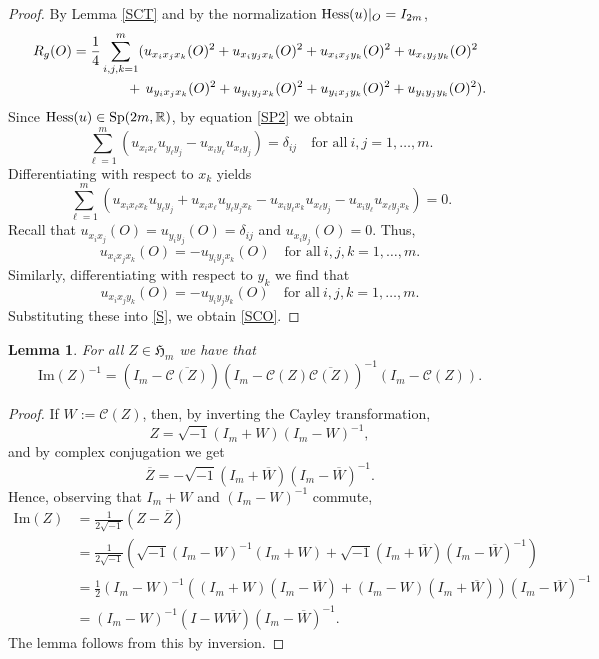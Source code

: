 \documentclass[11pt,reqno]{amsart}
\newcommand{\R}{\mathbb{R}}
\theoremstyle{plain}
\newtheorem{lemma}[theorem]{Lemma}
\theoremstyle{definition}
\numberwithin{equation}{section}
\begin{document}
\begin{proof}
By Lemma \ref{SCT} and by the normalization ${\rm Hess}(u)|_O = I_{2m}$,
\begin{align}\label{S}
\begin{split}
    R_g(O)&= \frac{1}{4}\sum_{i,j,k=1}^{m} (u_{x_{i}x_{j}x_{k}}(O)^{2} + u_{x_{i}y_{j}x_{k}}(O)^{2} +u_{x_{i}x_{j}y_{k}}(O)^{2} +u_{x_{i}y_{j}y_{k}}(O)^{2} \\
    &   \displaystyle \ \ \ \ \ \ \hspace{5.5mm}\ +\,u_{y_{i}x_{j}x_{k}}(O)^{2} +u_{y_{i}y_{j}x_{k}}(O)^{2}+u_{y_{i}x_{j}y_{k}}(O)^{2}+u_{y_{i}y_{j}y_{k}}(O)^{2}).
\end{split}
\end{align}
Since ${\rm Hess}(u)\in {\rm Sp}(2m,\R)$, by equation \eqref{SP2} we obtain
$$\sum_{\ell=1}^m (u_{x_i x_\ell} u_{y_\ell y_j} - u_{x_i y_\ell} u_{x_\ell y_j})= \delta_{ij} \quad \text{for all} \  i,j = 1, \ldots, m.$$
Differentiating with respect to $x_{k}$ yields
$$\sum_{\ell=1}^m (u_{x_i x_\ell x_k} u_{y_\ell y_j} + u_{x_i x_\ell} u_{y_\ell y_j x_k} - u_{x_i y_\ell x_k} u_{x_\ell y_j} - u_{x_i y_\ell} u_{x_\ell y_j x_k}) = 0.$$
Recall that $u_{x_{i}x_{j}}(O)=u_{y_{i}y_{j}}(O)=\delta_{ij}$ and $u_{x_{i}y_{j}}(O)=0$. Thus,
$$u_{x_{i}x_{j}x_{k}}(O) =-u_{y_{i}y_{j}x_{k}}(O) \quad \text{for all}\  i,j,k=1,\ldots,m.$$
Similarly, differentiating with respect to $y_{k}$ we find that
$$u_{x_i x_j y_k}(O) = - u_{y_i y_j y_k}(O) \quad \text{for all}\ i,j,k=1,\ldots,m.$$
Substituting these into \eqref{S}, we obtain \eqref{SCO}. 
\end{proof}

\begin{lemma}\label{CT}
For all $Z \in \mathfrak{H}_m$ we have that
$$\mathrm{Im}(Z)^{-1}=(I_{m}-\overline{{\mathscr{C}(Z)}})(I_{m}-\mathscr{C}(Z)\overline{\mathscr{C}(Z)})^{-1}(I_{m}-\mathscr{C}(Z)).$$
\end{lemma}

\begin{proof}
If $W := \mathscr{C}(Z)$, then, by inverting the Cayley transformation,
$$Z =\sqrt{-1}(I_{m}+W)(I_{m}-W)^{-1},$$
and by complex conjugation we get
$$\overline{Z}=-\sqrt{-1}(I_{m}+\overline{W})(I_{m}-\overline{W})^{-1}.$$
Hence, observing that $I_m +W$ and $(I_m-W)^{-1}$ commute,
\begin{align*}
  \mathrm{Im}(Z) & =  \displaystyle \frac{1}{2\sqrt{-1}}(Z-\overline{Z})  \\
& =  \displaystyle \frac{1}{2\sqrt{-1}}(\sqrt{-1}(I_{m}-W)^{-1}(I_{m}+W)+\sqrt{-1}(I_m+\overline{W})(I_{m}-\overline{W})^{-1})\\
& = \displaystyle \frac{1}{2}(I_{m}-W)^{-1}((I_{m}+W)(I_{m}-\overline{W}) +(I_{m}-W)(I_{m}+\overline{W}))(I_{m}-\overline{W})^{-1}\\
   & =  (I_{m}-W)^{-1}(I-W\overline{W})(I_{m}-\overline{W})^{-1}.
\end{align*}
The lemma follows from this by inversion.
\end{proof}
\end{document}
